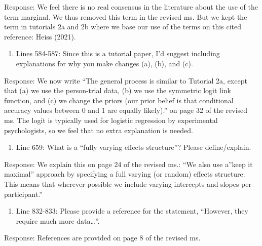 \documentclass[
]{article}
\providecommand{\tightlist}{%
  \setlength{\itemsep}{0pt}\setlength{\parskip}{0pt}}
\renewenvironment{quote}{\begin{leftbar}}{\end{leftbar}}
\begin{document}
Response: We feel there is no real consensus in the literature about the
use of the term marginal. We thus removed this term in the revised ms.
But we kept the term in tutorials 2a and 2b where we base our use of the
terms on this cited reference: Heiss (2021).

\begin{quote}
\begin{enumerate}
\def\labelenumi{\arabic{enumi}.}
\setcounter{enumi}{13}
\tightlist
\item
  Lines 584-587: Since this is a tutorial paper, I'd suggest including
  explanations for why you make changes (a), (b), and (c).
\end{enumerate}
\end{quote}

Response: We now write ``The general process is similar to Tutorial 2a,
except that (a) we use the person-trial data, (b) we use the symmetric
logit link function, and (c) we change the priors (our prior belief is
that conditional accuracy values between 0 and 1 are equally likely).''
on page 32 of the revised ms. The logit is typically used for logistic
regression by experimental psychologists, so we feel that no extra
explanation is needed.

\begin{quote}
\begin{enumerate}
\def\labelenumi{\arabic{enumi}.}
\setcounter{enumi}{14}
\tightlist
\item
  Line 659: What is a ``fully varying effects structure''? Please
  define/explain.
\end{enumerate}
\end{quote}

Response: We explain this on page 24 of the revised ms.: ``We also use
a''keep it maximal'' approach by specifying a full varying (or random)
effects structure. This means that wherever possible we include varying
intercepts and slopes per participant.''

\begin{quote}
\begin{enumerate}
\def\labelenumi{\arabic{enumi}.}
\setcounter{enumi}{15}
\tightlist
\item
  Line 832-833: Please provide a reference for the statement, ``However,
  they require much more data\ldots{}''.
\end{enumerate}
\end{quote}

Response: References are provided on page 8 of the revised ms.
\end{document}
